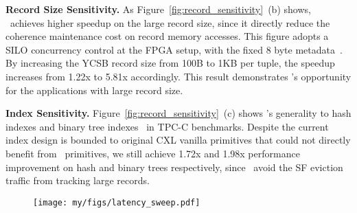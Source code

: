 \noindent \textbf{Record Size Sensitivity. } 
As Figure~\ref{fig:record_sensitivity}~(b) shows, \name~achieves higher speedup on the large record size, since it directly reduce the coherence maintenance cost on record memory accesses. This figure adopts a SILO concurrency control at the FPGA setup, with the fixed 8 byte metadata~\cite{silo_sosp13}. By increasing the YCSB record size from 100B to 1KB per tuple, the speedup increases from 1.22x to 5.81x accordingly. This result demonstrates \name's opportunity for the applications with large record size.

\noindent \textbf{Index Sensitivity. } 
Figure~\ref{fig:record_sensitivity}~(c) shows \name's generality to hash indexes and binary tree indexes~\cite{abyss_vldb14, masstree} in TPC-C benchmarks. Despite the current index design is bounded to original CXL vanilla primitives that could not directly benefit from \name~primitives, we still achieve 1.72x and 1.98x performance improvement on hash and binary trees respectively, since \name~avoid the SF eviction traffic from tracking large records. 



\begin{figure}[t]
  \centering
  \texttt{[image: my/figs/latency\_sweep.pdf]}
  \caption{}
  \label{fig:latency_sweep}
\end{figure}


